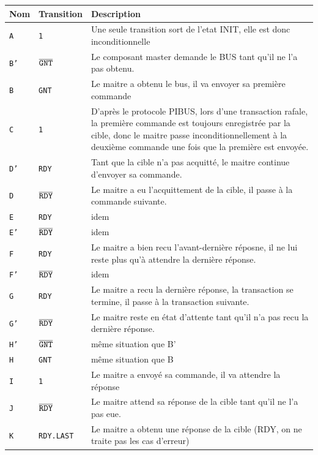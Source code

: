 \documentclass{article}
\begin{document}
\begin{table}[H]
\centering
\begingroup
\setlength{\tabcolsep}{5pt}
\renewcommand{\arraystretch}{1.1}
\begin{tabular}{ | l | l | p{15cm} |}
\hline
Nom    &   Transition  & Description \\
\hline
\tt{A}  & \tt{1} &
Une seule transition sort de l'etat INIT, elle est donc inconditionnelle \\
\tt{B'} & \tt{$\overline{\tt{GNT}}$} &
Le composant master demande le BUS tant qu'il ne l'a pas obtenu. \\
\tt{B}  & \tt{GNT} &
Le maitre a obtenu le bus, il va envoyer sa première commande \\
\hline
\tt{C}  & \tt{1} &
D'après le protocole PIBUS, lors d'une transaction rafale, la première commande
est toujours enregistrée par la cible, donc le maitre passe inconditionnellement
à la deuxième commande une fois que la première est envoyée. \\
\tt{D'} & \tt{RDY} &
Tant que la cible n'a pas acquitté, le maitre continue d'envoyer sa commande. \\
\tt{D}  & \tt{$\overline{\tt{RDY}}$} &
Le maitre a eu l'acquittement de la cible, il passe à la commande suivante. \\
\tt{E}  & \tt{RDY} &
idem \\
\tt{E'} & \tt{$\overline{\tt{RDY}}$} &
idem \\
\tt{F}  & \tt{RDY} &
Le maitre a bien recu l'avant-dernière réposne, il ne lui reste plus
qu'à attendre la dernière réponse. \\
\tt{F'} & \tt{$\overline{\tt{RDY}}$} &
idem \\
\tt{G}  & \tt{RDY} &
Le maitre a recu la dernière réponse, la transaction se termine,
il passe à la transaction suivante. \\
\tt{G'} & \tt{$\overline{\tt{RDY}}$} &
Le maitre reste en état d'attente tant qu'il n'a pas recu la dernière réponse. \\
\hline
\tt{H'} & \tt{$\overline{\tt{GNT}}$} &
même situation que B' \\
\tt{H}  & \tt{GNT} &
même situation que B \\
\tt{I}  & \tt{1} &
Le maitre a envoyé sa commande, il va attendre la réponse \\
\tt{J}  & \tt{$\overline{\tt{RDY}}$} &
Le maitre attend sa réponse de la cible tant qu'il ne l'a pas eue. \\
\tt{K}  & \tt{RDY.LAST} &
Le maitre a obtenu une réponse de la cible (RDY, on ne traite pas les cas d'erreur)

\end{tabular}
\end{table}
\end{document}
